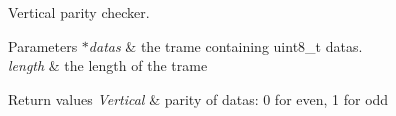Vertical parity checker. 


\begin{DoxyParams}{Parameters}
{\em $\ast$datas} & the trame containing {\ttfamily uint8\+\_\+t} datas. \\
\hline
{\em length} & the length of the trame \\
\hline
\end{DoxyParams}

\begin{DoxyRetVals}{Return values}
{\em Vertical} & parity of datas\+: 0 for even, 1 for odd \\
\hline
\end{DoxyRetVals}
